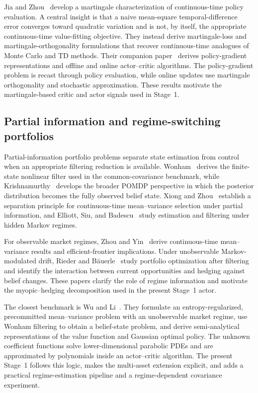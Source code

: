 \documentclass[a4paper,10pt]{article}
\begin{document}
Jia and Zhou~\cite{jiazhope2022} develop a martingale characterization of continuous-time policy evaluation. A central insight is that a naive mean-square temporal-difference error converges toward quadratic variation and is not, by itself, the appropriate continuous-time value-fitting objective. They instead derive martingale-loss and martingale-orthogonality formulations that recover continuous-time analogues of Monte Carlo and TD methods. Their companion paper~\cite{jiazhopepg2022} derives policy-gradient representations and offline and online actor--critic algorithms. The policy-gradient problem is recast through policy evaluation, while online updates use martingale orthogonality and stochastic approximation. These results motivate the martingale-based critic and actor signals used in Stage~1.

\subsection{Partial information and regime-switching portfolios}

Partial-information portfolio problems separate state estimation from control when an appropriate filtering reduction is available. Wonham~\cite{wonham1964} derives the finite-state nonlinear filter used in the common-covariance benchmark, while Krishnamurthy~\cite{krishnamurthy2016} develops the broader POMDP perspective in which the posterior distribution becomes the fully observed belief state. Xiong and Zhou~\cite{xiongzhou2007} establish a separation principle for continuous-time mean--variance selection under partial information, and Elliott, Siu, and Badescu~\cite{elliott2010} study estimation and filtering under hidden Markov regimes.

For observable market regimes, Zhou and Yin~\cite{zhouyin2003} derive continuous-time mean--variance results and efficient-frontier implications. Under unobservable Markov-modulated drift, Rieder and B{\"a}uerle~\cite{rieder2005} study portfolio optimization after filtering and identify the interaction between current opportunities and hedging against belief changes. These papers clarify the role of regime information and motivate the myopic--hedging decomposition used in the present Stage~1 actor.

The closest benchmark is Wu and Li~\cite{wu2024}. They formulate an entropy-regularized, precommitted mean--variance problem with an unobservable market regime, use Wonham filtering to obtain a belief-state problem, and derive semi-analytical representations of the value function and Gaussian optimal policy. The unknown coefficient functions solve lower-dimensional parabolic PDEs and are approximated by polynomials inside an actor--critic algorithm. The present Stage~1 follows this logic, makes the multi-asset extension explicit, and adds a practical regime-estimation pipeline and a regime-dependent covariance experiment.
\end{document}
